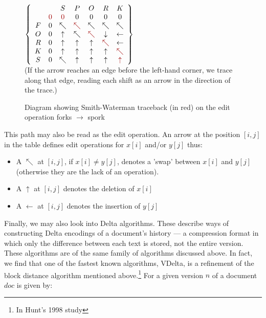\documentclass[a4paper,11pt,twoside,notitlepage]{article}
\begin{document}
        \begin{figure}[h!]
          \centering
          $\left\{
                \begin{array}{ccccccc}
                    &   & S & P & O & R & K \\
                    & \color{red}{0} & \color{red}{0} & 0 & 0 & 0 & 0 \\
                  F & 0 & \nwarrow & \color{red}{\nwarrow} & \nwarrow & \nwarrow & \nwarrow \\
                  O & 0 & \uparrow & \nwarrow & \color{red}{\nwarrow} & \downarrow & \leftarrow \\
                  R & 0 & \uparrow & \uparrow & \uparrow & \color{red}{\nwarrow} & \leftarrow \\
                  K & 0 & \uparrow & \uparrow & \uparrow & \uparrow & \color{red}{\nwarrow} \\
                  S & 0 & \nwarrow & \uparrow & \uparrow & \uparrow & \color{red}{\uparrow} \\
                \end{array}\right\} $\\
                (If the arrow reaches an edge before the left-hand
                corner, we trace along that edge, reading each shift
                as an arrow in the direction of the trace.)
                \caption{Diagram showing Smith-Waterman traceback (in
                  red) on the edit operation forks $\rightarrow$
                  spork}
          \label{fig:smith-waterman-traceback}
        \end{figure}

        This path may also be read as the edit operation. An arrow at
        the position $[i,j]$ in the table defines edit operations for
        $x[i]$ and/or $y[j]$ thus:
        \begin{itemize}
          \item A $\nwarrow$ at $[i,j]$, if
        $x[i] \neq y[j]$, denotes a 'swap' between $x[i]$ and $y[j]$
        (otherwise they are the lack of an operation).
          \item A $\uparrow$ at $[i,j]$ denotes the deletion of $x[i]$
          \item A $\leftarrow$ at $[i,j]$ denotes the insertion of $y[j]$
        \end{itemize}

        Finally, we may also look into Delta algorithms. These
        describe ways of constructing Delta encodings of a document's
        history --- a compression format in which only the difference
        between each text is stored, not the entire version. These
        algorithms are of the same family of algorithms discussed
        above. In fact, we find that one of the fastest known
        algorithms, VDelta, is a refinement of the block distance
        algorithm mentioned above.\footnote{In Hunt's 1998
          study\cite{Hunt1998}} For a given version $n$ of a document
        $doc$ is given by:
        
\end{document}
